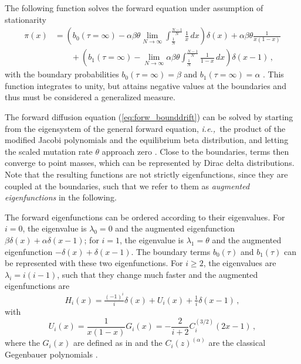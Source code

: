 \documentclass[preprint]{elsarticle}
\newcommand\ie{{\it i.e.,}}
\begin{document}
The following function solves the forward equation under assumption of stationarity
\begin{equation}
\begin{split}
    \pi(x)&=\left(b_0(\tau=\infty)-\alpha\beta\theta \lim_{N\to\infty}\int_{\tfrac1N}^{\tfrac{N-1}N} \frac1x\,dx\right)\delta(x)+\alpha\beta\theta\frac{1}{x(1-x)} \\
    &\qquad+\left(b_1(\tau=\infty)-\lim_{N\to\infty}\alpha\beta\theta \int_{\tfrac1N}^{\tfrac{N-1}N} \frac1{1-x}\,dx\right)\delta(x-1)\,,
\end{split}
\end{equation}
with the boundary probabilities $b_0(\tau=\infty)=\beta$ and $b_1(\tau=\infty)=\alpha$ \citep{Vogl15,Vogl16}. This function integrates to unity, but attains negative values at the boundaries and thus must be considered a generalized measure. 

The forward diffusion equation (\ref{eq:forw_bounddrift}) can be solved by starting from the eigensystem of the general forward equation, \ie\ the product of the modified Jacobi polynomials \citep{Song12} and the equilibrium beta distribution, and letting the scaled mutation rate $\theta$ approach zero \citep[][Appendix A.1]{Vogl15}. Close to the boundaries, terms then converge to point masses, which can be represented by Dirac delta distributions. Note that the resulting functions are not strictly eigenfunctions, since they are coupled at the boundaries, such that we refer to them as \textit{augmented eigenfunctions} in the following. 

The forward eigenfunctions can be ordered according to their eigenvalues. For $i=0$, the eigenvalue is $\lambda_0=0$ and the augmented eigenfunction $\beta\delta(x)+\alpha\delta(x-1)$; for $i=1$, the eigenvalue is $\lambda_1=\theta$ and the augmented eigenfunction $-\delta(x)+\delta(x-1)$. The boundary terms $b_0(\tau)$ and $b_1(\tau)$ can be represented with these two eigenfunctions. For $i\geq 2$, the eigenvalues are $\lambda_i=i(i-1)$, such that they change much faster and the augmented eigenfunctions are \begin{equation}\label{eq:forw_eigen}
    H_i(x)=\tfrac{(-1)^i}{i}\delta(x)+U_i(x)+\tfrac{1}{i}\delta(x-1)\,,
\end{equation}
with 
\begin{equation}
    U_i(x)=\frac1{x(1-x)}G_i(x)=-\frac2{i+2}C_i^{(3/2)}(2x-1)\,,
\end{equation}
where the $G_i(x)$ are defined as in \citet{Song12} and the $C_i(z)^{(\alpha)}$ are the classical Gegenbauer polynomials \citep{Abra70}.
\end{document}
